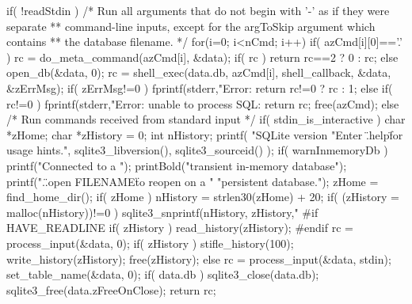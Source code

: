 \begin{Codex}[label=shell.c,numbers=left]
{  if( !readStdin ){
    /* Run all arguments that do not begin with '-' as if they were separate
    ** command-line inputs, except for the argToSkip argument which contains
    ** the database filename.
    */
    for(i=0; i<nCmd; i++){
      if( azCmd[i][0]=='.' ){
        rc = do_meta_command(azCmd[i], &data);
        if( rc ) return rc==2 ? 0 : rc;
      }else{
        open_db(&data, 0);
        rc = shell_exec(data.db, azCmd[i], shell_callback, &data, &zErrMsg);
        if( zErrMsg!=0 ){
          fprintf(stderr,"Error: %
          return rc!=0 ? rc : 1;
        }else if( rc!=0 ){
          fprintf(stderr,"Error: unable to process SQL: %
          return rc;
        }
      }
    }
    free(azCmd);
  }else{
    /* Run commands received from standard input
    */
    if( stdin_is_interactive ){
      char *zHome;
      char *zHistory = 0;
      int nHistory;
      printf(
        "SQLite version %
        "Enter \".help\" for usage hints.\n",
        sqlite3_libversion(), sqlite3_sourceid()
      );
      if( warnInmemoryDb ){
        printf("Connected to a ");
        printBold("transient in-memory database");
        printf(".\nUse \".open FILENAME\" to reopen on a "
               "persistent database.\n");
      }
      zHome = find_home_dir();
      if( zHome ){
        nHistory = strlen30(zHome) + 20;
        if( (zHistory = malloc(nHistory))!=0 ){
          sqlite3_snprintf(nHistory, zHistory,"%
        }
      }
#if HAVE_READLINE
      if( zHistory ) read_history(zHistory);
#endif
      rc = process_input(&data, 0);
      if( zHistory ){
        stifle_history(100);
        write_history(zHistory);
        free(zHistory);
      }
    }else{
      rc = process_input(&data, stdin);
    }
  }
  set_table_name(&data, 0);
  if( data.db ){
    sqlite3_close(data.db);
  }
  sqlite3_free(data.zFreeOnClose); 
  return rc;
}
\end{Codex}
